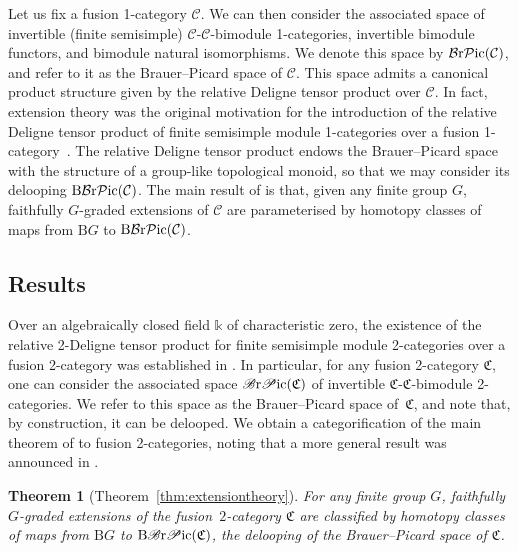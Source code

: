 \documentclass[pdftex]{sigma}
\newtheorem*{Theorem*}{Theorem}
\numberwithin{equation}{section}
\begin{document}
Let us fix a fusion 1-category $\mathcal{C}$. We can then consider the associated space of invertible (finite semisimple) $\mathcal{C}$-$\mathcal{C}$-bimodule 1-categories, invertible bimodule functors, and bimodule natural isomorphisms. We denote this space by $\mathcal{B}{\rm r}\mathcal{P}{\rm ic}(\mathcal{C})$, and refer to it as the Brauer--Picard space of $\mathcal{C}$. This space admits a canonical product structure given by the relative Deligne tensor product over $\mathcal{C}$. In fact, extension theory was the original motivation for the introduction of the relative Deligne tensor product of finite semisimple module 1-categories over a fusion 1-category~\cite{ENO2}. The relative Deligne tensor product endows the Brauer--Picard space with the structure of a group-like topological monoid, so that we may consider its delooping $\mathrm{B}\mathcal{B}{\rm r}\mathcal{P}{\rm ic}(\mathcal{C})$. The main result of \cite{ENO2} is that, given any finite group $G$, faithfully $G$-graded extensions of $\mathcal{C}$ are parameterised by homotopy classes of maps from $\mathrm{B}G$ to $\mathrm{B}\mathcal{B}{\rm r}\mathcal{P}{\rm ic}(\mathcal{C})$.

\subsection{Results}

Over an algebraically closed field $\mathds{k}$ of characteristic zero, the existence of the relative 2-Deligne tensor product for finite semisimple module 2-categories over a fusion 2-category was established in \cite{D10}. In particular, for any fusion 2-category $\mathfrak{C}$, one can consider the associated space $\mathscr{B}{\rm r}\mathscr{P}{\rm ic}(\mathfrak{C})$ of invertible $\mathfrak{C}$-$\mathfrak{C}$-bimodule 2-categories. We refer to this space as the Brauer--Picard space of~$\mathfrak{C}$, and note that, by construction, it can be delooped. We obtain a categorification of the main theorem of \cite{ENO2} to fusion 2-categories, noting that a more general result was announced in \cite{JFR3}.

\begin{Theorem*}[Theorem~\ref{thm:extensiontheory}]
For any finite group $G$, faithfully $G$-graded extensions of the fusion~$2$-category $\mathfrak{C}$ are classified by homotopy classes of maps from $\mathrm{B}G$ to $\mathrm{B}\mathscr{B}{\rm r}\mathscr{P}{\rm ic}(\mathfrak{C})$, the delooping of the Brauer--Picard space of $\mathfrak{C}$.
\end{Theorem*}
\end{document}
